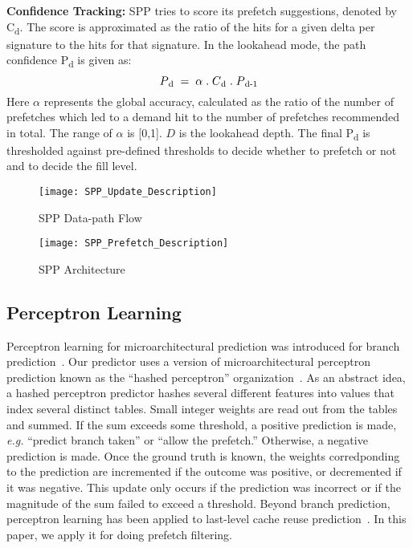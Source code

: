 \noindent \textbf{Confidence Tracking:} 
SPP tries to score its prefetch suggestions, denoted by C\textsubscript{d}.
The score is approximated as the ratio of the hits for a given delta per
signature to the hits for that signature. In the lookahead mode, the path
confidence P\textsubscript{d} is given as: $$P\textsubscript{d} \;=\; \alpha  
\;.\;  C\textsubscript{d}  \;.\; P\textsubscript{d-1}$$ Here $\alpha$ represents 
the global accuracy, calculated as the ratio of the number of prefetches which 
led to a demand hit to the number of prefetches recommended in total. The range
of $\alpha$ is [0,1].  $D$ is the lookahead depth. The final P\textsubscript{d} 
is thresholded against pre-defined thresholds to decide whether to prefetch or 
not and to decide the fill level.

\begin{figure}
  \begin{center}
  \texttt{[image: SPP\_Update\_Description]}
  \caption{SPP Data-path Flow}
  \label{fig:spp_update}
  \end{center}
\end{figure}


\begin{figure}
  \begin{center}
  \texttt{[image: SPP\_Prefetch\_Description]}
  \caption{SPP Architecture}
  \label{fig:spp_structure}
  \end{center}
\end{figure}

\subsection{Perceptron Learning}
\label{sec:Background-Perceptron}
Perceptron learning for microarchitectural prediction was introduced
for branch prediction~\cite{PerceptronPredictor}. Our predictor uses a
version of microarchitectural perceptron prediction known as the
``hashed perceptron'' organization~\cite{HashedPerceptron}. As an
abstract idea, a hashed perceptron predictor hashes several different
features into values that index several distinct tables. Small integer
weights are read out from the tables and summed. If the sum exceeds
some threshold, a positive prediction is made, {\em e.g.} ``predict
branch taken'' or ``allow the prefetch.'' Otherwise, a negative
prediction is made. Once the ground truth is known, the weights
corredponding to the prediction are incremented if the outcome was
positive, or decremented if it was negative. This update only occurs
if the prediction was incorrect or if the magnitude of the sum failed
to exceed a threshold.  Beyond branch prediction, perceptron learning
has been applied to last-level cache reuse
prediction~\cite{Perc_Reuse,Multiperspective}. In this paper, we apply
it for doing prefetch filtering.
